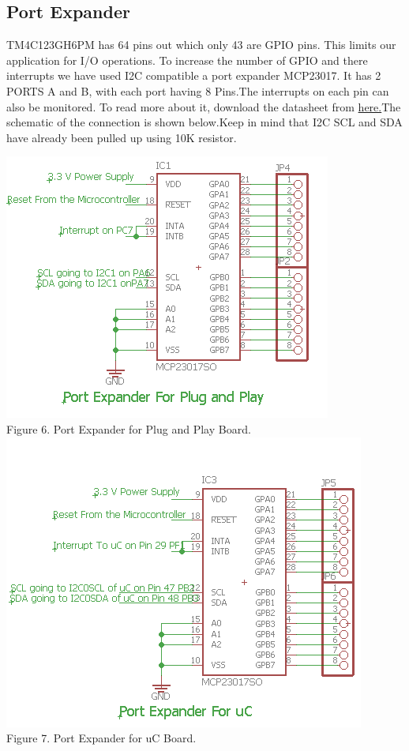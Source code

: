 \documentclass[a4paper,10pt,oneside]{article}
\begin{document}
{	\subsection{\textbf{Port Expander}}
	{TM4C123GH6PM has 64 pins out which only 43 are GPIO pins. This limits our application for I/O operations. To increase the number of GPIO and there interrupts we have used I2C compatible a port expander MCP23017. It has 2 PORTS A and B, with each port having 8 Pins.The interrupts on each pin can also be monitored. To read more about it, download the datasheet from   \href{www.microchip.com/downloads/en/DeviceDoc/21952b.pdf}{here.}The schematic of the connection is shown below.Keep in mind that I2C SCL and SDA have already been pulled up using 10K resistor.\\}
	\begin{center}
		\includegraphics{Images/portexpandePlug}\\
		Figure 6. Port Expander for Plug and Play Board.\\
		\includegraphics{Images/portExpanderuc}\\
		Figure 7. Port Expander for uC Board.	\\
	\end{center}
	\hspace{2cm}
}
\end{document}
